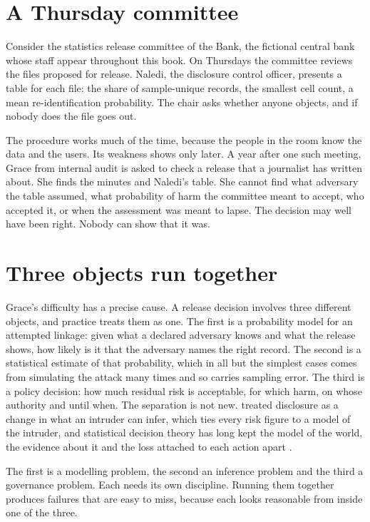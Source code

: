 \section{A Thursday committee}

Consider the statistics release committee of the Bank, the fictional central bank whose
staff appear throughout this book. On Thursdays the committee reviews the files proposed
for release. Naledi, the disclosure control officer, presents a table for each file: the
share of sample-unique records, the smallest cell count, a mean re-identification
probability. The chair asks whether anyone objects, and if nobody does the file goes out.

The procedure works much of the time, because the people in the room know the data and
the users. Its weakness shows only later. A year after one such meeting, Grace from
internal audit is asked to check a release that a journalist has written about. She finds
the minutes and Naledi's table. She cannot find what adversary the table assumed, what
probability of harm the committee meant to accept, who accepted it, or when the
assessment was meant to lapse. The decision may well have been right. Nobody can show
that it was.

\section{Three objects run together}

Grace's difficulty has a precise cause. A release decision involves three different
objects, and practice treats them as one. The first is a probability model for an
attempted linkage: given what a declared adversary knows and what the release shows, how
likely is it that the adversary names the right record. The second is a statistical
estimate of that probability, which in all but the simplest cases comes from simulating
the attack many times and so carries sampling error. The third is a policy decision: how
much residual risk is acceptable, for which harm, on whose authority and until when. The separation is not new. \citet{duncan1986} treated disclosure as a change in what an intruder can infer, which ties every risk figure to a model of the intruder, and statistical decision theory has long kept the model of the world, the evidence about it and the loss attached to each action apart \citep{berger1985}.

The first is a modelling problem, the second an inference problem and the third a
governance problem. Each needs its own discipline. Running them together produces failures
that are easy to miss, because each looks reasonable from inside one of the three.

